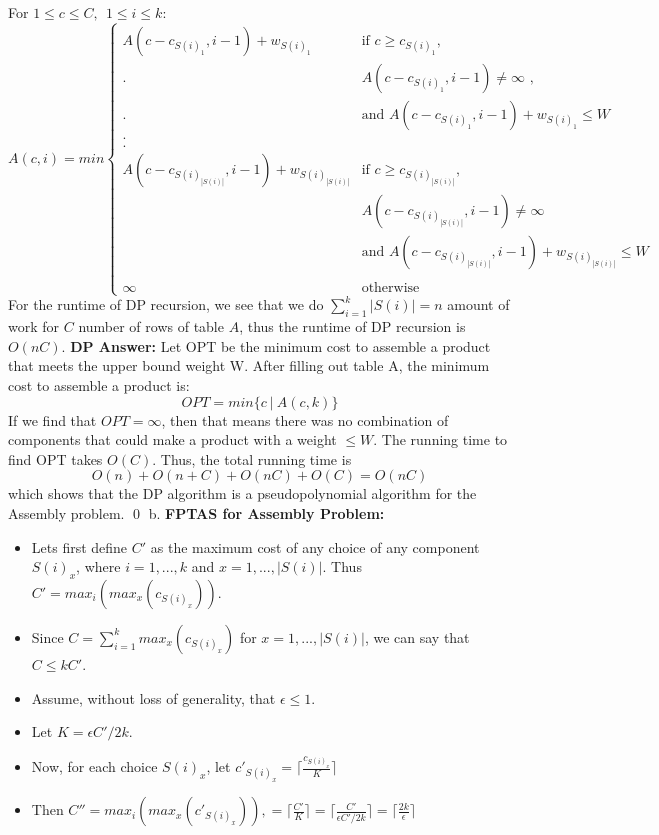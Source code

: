 \documentclass[oneside]{homework} %
\begin{document}
\newline
\newline
For $1 \leq c \leq C, \ \ 1 \leq i \leq k$:
\begin{equation*}
  A(c,i) = min
  \begin{cases}
    A(c-c_{S(i)_1}, i-1) + w_{S(i)_1} & \text{if $c \geq c_{S(i)_1}$,} \\
    . & \text{$A(c-c_{S(i)_1}, i-1) \neq \infty$ ,} \\
    . & \text{and $A(c-c_{S(i)_1}, i-1) + w_{S(i)_1} \leq W$} \\
    . \\
    . \\
    A(c-c_{S(i)_{|S(i)|}}, i-1) + w_{S(i)_{|S(i)|}} & \text{if $c \geq c_{S(i)_{|S(i)|}}$,} \\
     & \text{$A(c-c_{S(i)_{|S(i)|}}, i-1) \neq \infty$} \\
     & \text{and $A(c-c_{S(i)_{|S(i)|}}, i-1) + w_{S(i)_{|S(i)|}} \leq W$} \\
     \\
    \infty & \text{otherwise}
  \end{cases}
\end{equation*}
\newline
For the runtime of DP recursion, we see that we do $\sum\limits_{i=1}^{k}|S(i)| = n$ amount of work for $C$ number of rows of table $A$, thus the runtime of DP recursion is $O(nC)$.
\newline
\newline 
\textbf{DP Answer:}
\newline
Let OPT be the minimum cost to assemble a product that meets the upper bound weight W. After filling out table A, the minimum cost to assemble a product is: $$OPT = min\{ c \ | \ A(c,k) \}$$ If we find that $OPT = \infty$, then that means there was no combination of components that could make a product with a weight $\leq W$. The running time to find OPT takes $O(C)$. Thus, the total running time is $$O(n) + O(n + C) + O(nC) + O(C) = O(nC)$$ which shows that the DP algorithm is a pseudopolynomial algorithm for the Assembly problem. \hfill\qed
\newline
\newline
{\large b.} \textbf{FPTAS for Assembly Problem:}
\begin{itemize}
  \item Lets first define $C'$ as the maximum cost of any choice of any component $S(i)_x$, where $i = 1,...,k$ and $x = 1,...,|S(i)|$. Thus $C' = max_i(max_x(c_{S(i)_x}))$.
  \item Since $C = \sum\limits_{i=1}^{k}max_x(c_{S(i)_x})$ for $x = 1,...,|S(i)|$, we can say that $C \leq kC'$.
  \item Assume, without loss of generality, that $\epsilon \leq 1$.
  \item Let $K = \epsilon C' / 2k$.
  \item Now, for each choice $S(i)_x$, let $c'_{S(i)_x} = \lceil\frac{c_{S(i)_x}}{K}\rceil$
  \item Then $C'' = max_i(max_x(c'_{S(i)_x})) ,= \lceil\frac{C'}{K}\rceil = \lceil\frac{C'}{\epsilon C'/2k}\rceil = \lceil\frac{2k}{\epsilon}\rceil$
\end{itemize}
\end{document}
